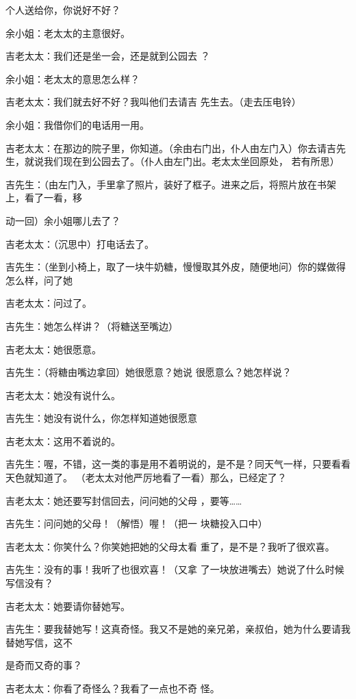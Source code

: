 \documentclass{article}
\begin{document}
个人送给你，你说好不好？ 


余小姐：老太太的主意很好。 

吉老太太：我们还是坐一会，还是就到公园去
？ 


余小姐：老太太的意思怎么样？ 

吉老太太：我们就去好不好？我叫他们去请吉
先生去。（走去压电铃） 


余小姐：我借你们的电话用一用。 

吉老太太：在那边的院子里，你知道。（余由右门出，仆人由左门入）你去请吉先生，就说我们现在到公园去了。（仆人由左门出。老太太坐回原处，
若有所思） 

吉先生：（由左门入，手里拿了照片，装好了框子。进来之后，将照片放在书架上，看了一看，移
\newpage

动一回）余小姐哪儿去了？ 


吉老太太：（沉思中）打电话去了。 

吉先生：（坐到小椅上，取了一块牛奶糖，慢慢取其外皮，随便地问）你的媒做得怎么样，问了她


吉老太太：问过了。 


吉先生：她怎么样讲？（将糖送至嘴边） 


吉老太太：她很愿意。 

吉先生：（将糖由嘴边拿回）她很愿意？她说
很愿意么？她怎样说？ 


吉老太太：她没有说什么。 

吉先生：她没有说什么，你怎样知道她很愿意


\newpage

吉老太太：这用不着说的。 

吉先生：喔，不错，这一类的事是用不着明说的，是不是？同天气一样，只要看看天色就知道了。
（老太太对他严厉地看了一看）那么，已经定了？ 

吉老太太：她还要写封信回去，问问她的父母
，要等…… 

吉先生：问问她的父母！（解悟）喔！（把一
块糖投入口中） 

吉老太太：你笑什么？你笑她把她的父母太看
重了，是不是？我听了很欢喜。 

吉先生：没有的事！我听了也很欢喜！（又拿
了一块放进嘴去）她说了什么时候写信没有？ 


吉老太太：她要请你替她写。 

吉先生：要我替她写！这真奇怪。我又不是她的亲兄弟，亲叔伯，她为什么要请我替她写信，这不
\newpage

是奇而又奇的事？ 

吉老太太：你看了奇怪么？我看了一点也不奇
怪。 
\end{document}
